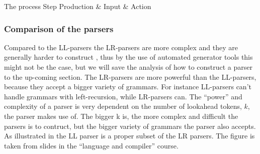 	  {The process	    					 }
{Step  	 }{Production & Input       & Action                     }{
}

\subsubsection{Comparison of the parsers}
Compared to the LL-parsers the LR-parsers are more complex and they are generally harder
to construct \cite[pp. 193]{sebesta2013}, thus by the use of automated generator tools this
might not be the case, but we will save the analysis of how to construct a parser to the up-coming section.  
The LR-parsers are more powerful than the LL-parsers, because they accept a bigger variety of grammars. 
For instance LL-parsers can't handle grammars with left-recursion,
while LR-parsers can. The ``power'' and complexity of a parser is very dependent on the number of lookahead tokens, $k$,
the parser makes use of. The bigger k is, the more complex and difficult the parsers is to contruct, but the bigger variety of
grammars the parser also accepts. As illustrated in  the LL parser is a proper subset of the LR parsers.
The figure is taken from slides in the ``language and compiler'' course. 

